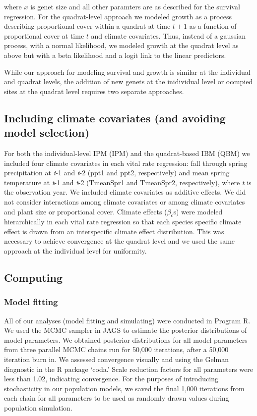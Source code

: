 \documentclass[12pt]{article}
\begin{document}
\noindent where $x$ is genet size and all other paramters are as described for the survival regression. For the quadrat-level approach we modeled growth as a process describing proportional cover within a quadrat at time $t+1$ as a function of proportional cover at time $t$ and climate covariates. Thus, instead of a gaussian process, with a normal likelihood, we modeled growth at the quadrat level as above but with a beta likelihood and a logit link to the linear predictors.  

While our approach for modeling survival and growth is similar at the individual and quadrat levels, the addition of new genets at the inidividual level or occupied sites at the quadrat level requires two separate approaches.

\subsection{Including climate covariates (and avoiding model selection)}
For both the individual-level IPM (IPM) and the quadrat-based IBM (QBM) we included four climate covariates in each vital rate regression: fall through spring precipitation at \emph{t}-1 and \emph{t}-2 (ppt1 and ppt2, respectively) and mean spring temperature at \emph{t}-1 and \emph{t}-2 (TmeanSpr1 and TmeanSpr2, respectively), where \emph{t} is the observation year. We included climate covariates as additive effects. We did not consider interactions among climate covariates or among climate covariates and plant size or proportional cover. Climate effects ($\beta_{c}$s) were modeled hierarchically in each vital rate regression so that each species specific climate effect is drawn from an interspecific climate effect distribution. This was necessary to achieve convergence at the quadrat level and we used the same approach at the individual level for uniformity.

\subsection{Computing}
\subsubsection{Model fitting}
All of our analyses (model fitting and simulating) were conducted in Program R. We used the MCMC sampler in JAGS to estimate the posterior distributions of model parameters. We obtained posterior distributions for all model parameters from three parallel MCMC chains run for 50,000 iterations, after a 50,000 iteration burn in. We assessed convergence visually and using the Gelman diagnostic in the R package `coda.' Scale reduction factors for all parameters were less than 1.02, indicating convergence. For the purposes of introducing stochasticity in our population models, we saved the final 1,000 iterations from each chain for all parameters to be used as randomly drawn values during population simulation.
\end{document}
